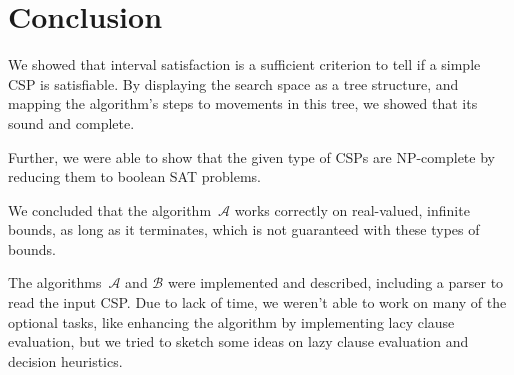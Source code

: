 \section{Conclusion}\label{sec:conclusion}

We showed that interval satisfaction is a sufficient criterion to tell if a simple CSP is satisfiable.
By displaying the search space as a tree structure, and mapping the algorithm's steps to movements in this tree, we showed that its sound and complete.

Further, we were able to show that the given type of CSPs are NP-complete by reducing them to boolean SAT problems.

We concluded that the algorithm~$\mathcal{A}$ works correctly on real-valued, infinite bounds, as long as it terminates, which is not guaranteed with these types of bounds.

The algorithms~$\mathcal{A}$ and $\mathcal{B}$ were implemented and described, including a parser to read the input CSP. Due to lack of time, we weren't able to work on many of the optional tasks, like enhancing the algorithm by implementing lacy clause evaluation, but we tried to sketch some ideas on lazy clause evaluation and decision heuristics.

